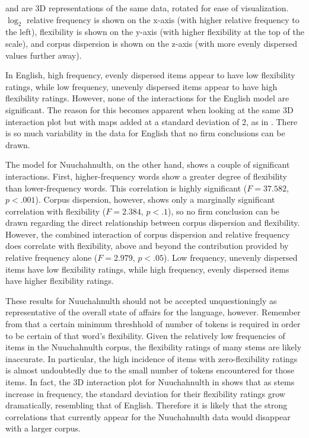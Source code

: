 
 and  are 3D representations of the same data, rotated for ease of visualization. $\log_2$ relative frequency is shown on the x-axis (with higher relative frequency to the left), flexibility is shown on the y-axis (with higher flexibility at the top of the scale), and corpus dispersion is shown on the z-axis (with more evenly dispersed values further away).

In English, high frequency, evenly dispersed items appear to have low flexibility ratings, while low frequency, unevenly dispersed items appear to have high flexibility ratings. However, none of the interactions for the English model are significant. The reason for this becomes apparent when looking at the same 3D interaction plot but with maps added at a standard deviation of 2, as in . There is so much variability in the data for English that no firm conclusions can be drawn.

The model for Nuuchahnulth, on the other hand, shows a couple of significant interactions. First, higher-frequency words show a greater degree of flexibility than lower-frequency words. This correlation is highly significant ($F = 37.582$, $p < .001$). Corpus dispersion, however, shows only a marginally significant correlation with flexibility ($F = 2.384$, $p < .1$), so no firm conclusion can be drawn regarding the direct relationship between corpus dispersion and flexibility. However, the combined interaction of corpus dispersion and relative frequency does correlate with flexibility, above and beyond the contribution provided by relative frequency alone ($F = 2.979$, $p < .05$). Low frequency, unevenly dispersed items have low flexibility ratings, while high frequency, evenly dispersed items have higher flexibility ratings.

These results for Nuuchahnulth should not be accepted unquestioningly as representative of the overall state of affairs for the language, however. Remember from  that a certain minimum threshhold of number of tokens is required in order to be certain of that word's flexibility. Given the relatively low frequencies of items in the Nuuchahnulth corpus, the flexibility ratings of many stems are likely inaccurate. In particular, the high incidence of items with zero-flexibility ratings is almost undoubtedly due to the small number of tokens encountered for those items. In fact, the 3D interaction plot for Nuuchahnulth in  shows that as stems increase in frequency, the standard deviation for their flexibility ratings grow dramatically, resembling that of English. Therefore it is likely that the strong correlations that currently appear for the Nuuchahnulth data would disappear with a larger corpus.

